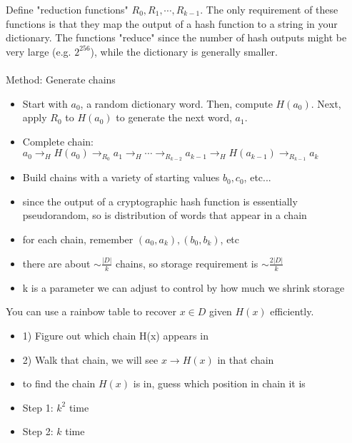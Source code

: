 Define "reduction functions" $R_0, R_1, \cdots, R_{k-1}.$ The only requirement of these functions is that they map the output of a hash function to a string in your dictionary. The functions "reduce" since the number of hash outputs might be very large (e.g. $2^{256}$), while the dictionary is generally smaller.
\\
\\
Method: Generate chains
	\begin{itemize}
		\item Start with $a_0$, a random dictionary word. Then, compute $H(a_0)$. Next, apply $R_0$ to $H(a_0)$ to generate the next word, $a_1$. 
		\item Complete chain: $a_0 \to_H H(a_0) \to_{R_0} a_1 \to_H \cdots \to_{R_{k-2}} a_{k-1} \to_H H(a_{k-1}) \to_{R_{k-1}} a_k$
		\item Build chains with a variety of starting values $b_0, c_0$, etc...
		\item since the output of a cryptographic hash function is essentially pseudorandom, so is distribution of words that appear in a chain
		\item for each chain, remember $(a_0, a_k), (b_0, b_k)$, etc
		\item there are about $\sim \frac{|D|}{k}$ chains, so storage requirement is $\sim \frac{2|D|}{k}$
		\item k is a parameter we can adjust to control by how much we shrink storage
	\end{itemize}
	
You can use a rainbow table to recover $x \in D$ given $H(x)$ efficiently. 
	\begin{itemize}
		\item 1) Figure out which chain H(x) appears in
		\item 2) Walk that chain, we will see $x \to H(x)$ in that chain
		\item to find the chain $H(x)$ is in, guess which position in chain it is
		\item Step 1: $k^2$ time
		\item Step 2: $k$ time
	\end{itemize}